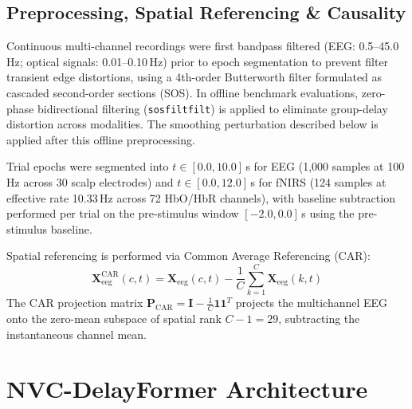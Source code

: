 \documentclass[journal]{IEEEtran}
\begin{document}
\subsection{Preprocessing, Spatial Referencing \& Causality}
Continuous multi-channel recordings were first bandpass filtered (EEG: 0.5--45.0\,Hz; optical signals: 0.01--0.10\,Hz) prior to epoch segmentation to prevent filter transient edge distortions, using a 4th-order Butterworth filter formulated as cascaded second-order sections (SOS). In offline benchmark evaluations, zero-phase bidirectional filtering (\texttt{sosfiltfilt}) is applied to eliminate group-delay distortion across modalities. The smoothing perturbation described below is applied after this offline preprocessing.

Trial epochs were segmented into $t \in [0.0, 10.0]$\,s for EEG (1,000 samples at 100\,Hz across 30 scalp electrodes) and $t \in [0.0, 12.0]$\,s for fNIRS (124 samples at effective rate 10.33\,Hz across 72 HbO/HbR channels), with baseline subtraction performed per trial on the pre-stimulus window $[-2.0, 0.0]$\,s using the pre-stimulus baseline.

Spatial referencing is performed via Common Average Referencing (CAR):
\begin{equation}
\mathbf{X}_{\text{eeg}}^{\text{CAR}}(c, t) = \mathbf{X}_{\text{eeg}}(c, t) - \frac{1}{C} \sum_{k=1}^C \mathbf{X}_{\text{eeg}}(k, t)
\end{equation}
The CAR projection matrix $\mathbf{P}_{\text{CAR}} = \mathbf{I} - \frac{1}{C}\mathbf{1}\mathbf{1}^T$ projects the multichannel EEG onto the zero-mean subspace of spatial rank $C - 1 = 29$, subtracting the instantaneous channel mean.

\section{NVC-DelayFormer Architecture}
\end{document}
